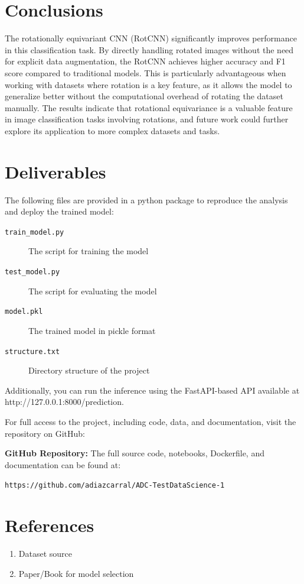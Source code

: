 \documentclass[12pt]{article}
\begin{document}
\section{Conclusions}
The rotationally equivariant CNN (RotCNN) significantly improves performance in this classification task. By directly handling rotated images without the need for explicit data augmentation, the RotCNN achieves higher accuracy and F1 score compared to traditional models. This is particularly advantageous when working with datasets where rotation is a key feature, as it allows the model to generalize better without the computational overhead of rotating the dataset manually. The results indicate that rotational equivariance is a valuable feature in image classification tasks involving rotations, and future work could further explore its application to more complex datasets and tasks.

\section{Deliverables}

The following files are provided in a python package to reproduce the analysis and deploy the trained model:

\begin{description}
    \item[\texttt{train\_model.py}] The script for training the model
    \item[\texttt{test\_model.py}] The script for evaluating the model
    \item[\texttt{model.pkl}] The trained model in pickle format
    \item[\texttt{structure.txt}] Directory structure of the project
\end{description}

Additionally, you can run the inference using the FastAPI-based API available at http://127.0.0.1:8000/prediction. 

For full access to the project, including code, data, and documentation, visit the repository on GitHub: 

\textbf{GitHub Repository:} The full source code, notebooks, Dockerfile, and documentation can be found at:
\begin{center}
\texttt{https://github.com/adiazcarral/ADC-TestDataScience-1}
\end{center}

\section{References}
\begin{enumerate}
    \item Dataset source
    \item Paper/Book for model selection
\end{enumerate}
\end{document}
